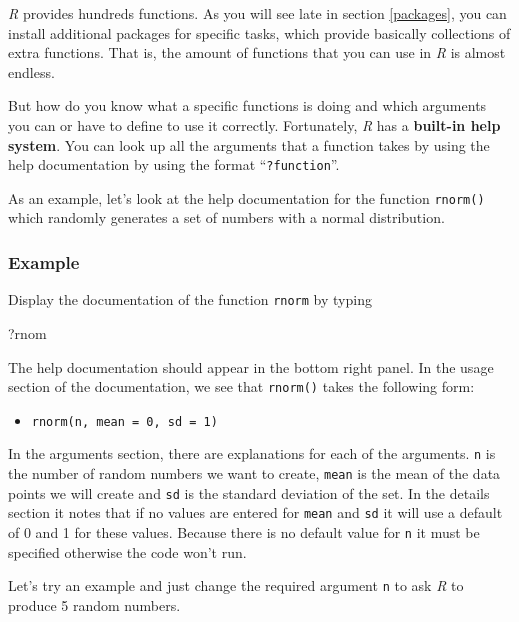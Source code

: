 \documentclass[
]{scrartcl}
\newenvironment{Shaded}{\begin{snugshade}}{\end{snugshade}}
\newcommand{\NormalTok}[1]{#1}
\providecommand{\tightlist}{%
  \setlength{\itemsep}{0pt}\setlength{\parskip}{0pt}}
\begin{document}
\emph{R} provides hundreds functions. As you will see late in section
\ref{packages}, you can install additional packages for specific tasks,
which provide basically collections of extra functions. That is, the
amount of functions that you can use in \emph{R} is almost endless.

But how do you know what a specific functions is doing and which
arguments you can or have to define to use it correctly. Fortunately,
\emph{R} has a \textbf{built-in help system}. You can look up all the arguments
that a function takes by using the help documentation by using the
format ``\texttt{?function}''.

As an example, let's look at the help documentation for the function
\texttt{rnorm()} which randomly generates a set of numbers with a normal
distribution.

\subsubsection{Example}\label{examplernorm}

Display the documentation of the function \texttt{rnorm} by typing

\begin{Shaded}
\begin{Highlighting}[]
\NormalTok{?rnom}
\end{Highlighting}
\end{Shaded}

The help documentation should appear in the bottom right panel. In the
usage section of the documentation, we see that \texttt{rnorm()} takes the
following form:

\begin{itemize}
\tightlist
\item
  \texttt{rnorm(n,\ mean\ =\ 0,\ sd\ =\ 1)}
\end{itemize}

In the arguments section, there are explanations for each of the
arguments. \texttt{n} is the number of random numbers we want to create, \texttt{mean}
is the mean of the data points we will create and \texttt{sd} is the standard
deviation of the set. In the details section it notes that if no values
are entered for \texttt{mean} and \texttt{sd} it will use a default of 0 and 1 for
these values. Because there is no default value for \texttt{n} it must be
specified otherwise the code won't run.

Let's try an example and just change the required argument \texttt{n} to ask
\emph{R} to produce 5 random numbers.
\end{document}
